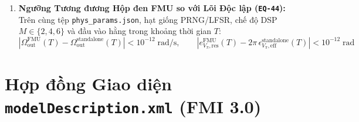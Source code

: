 \documentclass[11pt, a4paper]{article}
\begin{document}
\begin{enumerate}
    \item \textbf{Ngưỡng Tương đương Hộp đen FMU so với Lõi Độc lập (\texttt{EQ-44}):}
    Trên cùng tệp \texttt{phys\_params.json}, hạt giống PRNG/LFSR, chế độ DSP $M \in \{2,4,6\}$ và đầu vào hằng trong khoảng thời gian $T$:
    \begin{equation}
    \left|\Omega_{\text{out}}^{\text{FMU}}(T) - \Omega_{\text{out}}^{\text{standalone}}(T)\right| < 10^{-12}\;\text{rad/s}, \qquad
    \left|e_{V_\pi,\text{res}}^{\text{FMU}}(T) - 2\pi\,\epsilon_{V_\pi,\text{eff}}^{\text{standalone}}(T)\right| < 10^{-12}\;\text{rad}
    \label{eq:eq44_equiv}
    \end{equation}
\end{enumerate}

\section{Hợp đồng Giao diện \texttt{modelDescription.xml} (FMI 3.0)}
\end{document}
